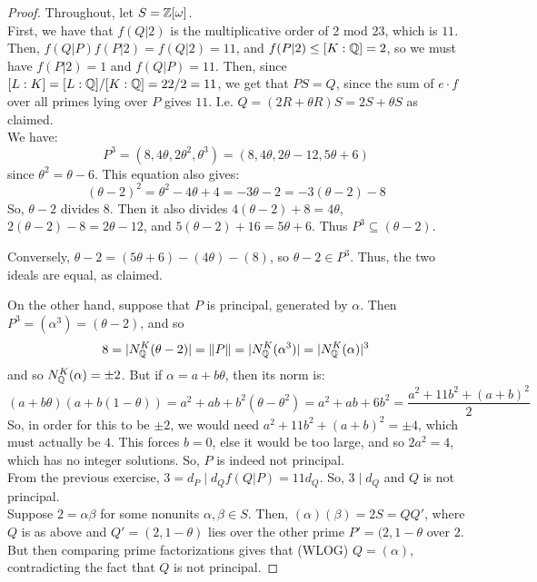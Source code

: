 \begin{proof}
	Throughout, let $S = \mathbb{Z}[\omega]$. \\
	
	First, we have that $f(Q|2)$ is the multiplicative order of 2 mod 23, which is $11$. Then, $f(Q|P)f(P|2) = f(Q|2) = 11$, and $f(P|2) \leq [K:\mathbb{Q}] = 2$, so we must have $f(P|2) = 1$ and $f(Q|P) = 11$. Then, since $[L:K] = [L:\mathbb{Q}]/[K:\mathbb{Q}] = 22/2 = 11$, we get that $PS = Q$, since the sum of $e \cdot f$ over all primes lying over $P$ gives $11$. I.e. $Q = (2R+\theta R)S = 2S + \theta S$ as claimed. \\
	
	We have:
	\[ P^3 = (8,4\theta,2\theta^2,\theta^3) = (8,4\theta,2\theta-12,5\theta+6) \]
	since $\theta^2 = \theta-6$. This equation also gives:
	\[ (\theta-2)^2 = \theta^2-4\theta+4 = -3\theta-2 = -3(\theta-2)-8 \]
	So, $\theta-2$ divides $8$. Then it also divides $4(\theta-2)+8 = 4\theta$, $2(\theta-2)-8 = 2\theta-12$, and $5(\theta-2)+16 = 5\theta+6$. Thus $P^3 \subseteq (\theta-2)$.
	
	Conversely, $\theta-2 = (5\theta+6)-(4\theta)-(8)$, so $\theta-2 \in P^3$. Thus, the two ideals are equal, as claimed.
	
	On the other hand, suppose that $P$ is principal, generated by $\alpha$. Then $P^3 = (\alpha^3) = (\theta-2)$, and so
	\[ 8 = |N_{\mathbb{Q}}^K(\theta-2)| = \|P\| = |N_{\mathbb{Q}}^K(\alpha^3)| = |N_{\mathbb{Q}}^K(\alpha)|^3 \]
	and so $N_{\mathbb{Q}}^K(\alpha) = \pm 2$. But if $\alpha = a+b\theta$, then its norm is:
	\[ (a+b\theta)(a+b(1-\theta)) = a^2+ab+b^2(\theta-\theta^2) = a^2+ab+6b^2 = \frac{a^2+11b^2+(a+b)^2}{2} \]
	So, in order for this to be $\pm 2$, we would need $a^2+11b^2+(a+b)^2 = \pm 4$, which must actually be $4$. This forces $b=0$, else it would be too large, and so $2a^2 = 4$, which has no integer solutions. So, $P$ is indeed not principal. \\
	
	From the previous exercise, $3 = d_P \mid d_Qf(Q|P) = 11d_Q$. So, $3 \mid d_Q$ and $Q$ is not principal. \\
	
	Suppose $2 = \alpha\beta$ for some nonunits $\alpha,\beta \in S$. Then, $(\alpha)(\beta) = 2S = QQ'$, where $Q$ is as above and $Q' = (2,1-\theta)$ lies over the other prime $P' = (2,1-\theta$ over 2. But then comparing prime factorizations gives that (WLOG) $Q = (\alpha)$, contradicting the fact that $Q$ is not principal.
\end{proof}
